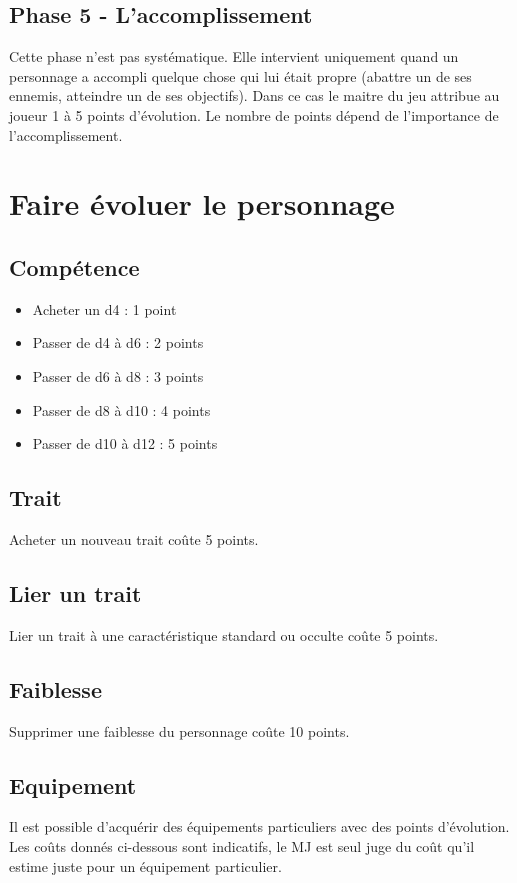 \documentclass{conf/FusinaClass}
\begin{document}
\section{Phase 5 - L'accomplissement}
Cette phase n'est pas systématique. Elle intervient uniquement quand un personnage a accompli quelque chose qui lui était propre (abattre un de ses ennemis, atteindre un de ses objectifs). Dans ce cas le maitre du jeu attribue au joueur 1 à 5 points d'évolution. Le nombre de points dépend de l'importance de l'accomplissement.

\chapter{Faire évoluer le personnage}
\section{Compétence}
\begin{itemize}
\item Acheter un d4 : 1 point
\item Passer de d4 à d6 : 2 points
\item Passer de d6 à d8 : 3 points
\item Passer de d8 à d10 : 4 points
\item Passer de d10 à d12 : 5 points
\end{itemize}

\section{Trait}
Acheter un nouveau trait coûte 5 points.

\section{Lier un trait}
Lier un trait à une caractéristique standard ou occulte coûte 5 points.

\section{Faiblesse}
Supprimer une faiblesse du personnage coûte 10 points.

\section{Equipement}
Il est possible d'acquérir des équipements particuliers avec des points d'évolution. Les coûts donnés ci-dessous sont indicatifs, le MJ est seul juge du coût qu'il estime juste pour un équipement particulier.
\end{document}
